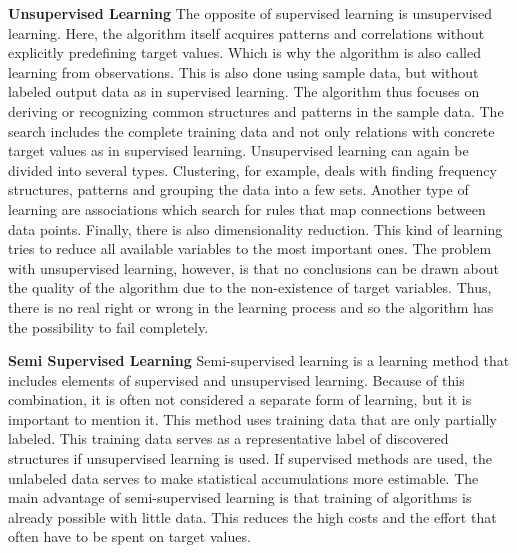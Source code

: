 \textbf{Unsupervised Learning}
The opposite of supervised learning is unsupervised learning.
Here, the algorithm itself acquires patterns and correlations without explicitly
predefining target values.
Which is why the algorithm is also called learning from observations.\cite[97]{schacht2019blockchain}
This is also done using sample data, but without labeled output data as in supervised learning.
The algorithm thus focuses on deriving or recognizing common structures and patterns in the sample data.\cite[7]{2018VDMAQuick}
The search includes the complete training data and not only relations with concrete
target values as in supervised learning.\cite[802]{ernst2016grundkurs}
Unsupervised learning can again be divided into several types.
Clustering, for example, deals with finding frequency structures, patterns and grouping the
data into a few sets.\cite[260]{Ertel2021}
Another type of learning are associations which search for rules that map connections between data points.
Finally, there is also dimensionality reduction. This kind of learning tries to reduce
all available variables to the most important ones.\cite[10]{FraunhoferMasch2018}
The problem with unsupervised learning, however, is that no conclusions can be drawn about
the quality of the algorithm due to the non-existence of target variables.
Thus, there is no real right or wrong in the learning process and so the algorithm has the possibility
to fail completely.\cite[97]{schacht2019blockchain}

\textbf{Semi Supervised Learning}
Semi-supervised learning is a learning method that includes elements of supervised
and unsupervised learning.
Because of this combination, it is often not considered a separate form of learning,
but it is important to mention it. This method uses training data that are only partially labeled.\cite[98]{schacht2019blockchain}
This training data serves as a representative label of discovered structures if unsupervised learning is used.
If supervised methods are used, the unlabeled data serves to make statistical accumulations more estimable.
The main advantage of semi-supervised learning is that
training of algorithms is already possible with little data.
This reduces the high costs and the effort that often have to be spent on target values.\cite{WuttkeDatasolutMachine}

